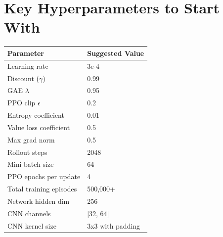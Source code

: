 \documentclass[11pt,a4paper]{article}
\begin{document}
\section{Key Hyperparameters to Start With}
\begin{tabular}{|l|l|}
\hline
\textbf{Parameter} & \textbf{Suggested Value} \\
\hline
Learning rate & 3e-4 \\
Discount ($\gamma$) & 0.99 \\
GAE $\lambda$ & 0.95 \\
PPO clip $\epsilon$ & 0.2 \\
Entropy coefficient & 0.01 \\
Value loss coefficient & 0.5 \\
Max grad norm & 0.5 \\
Rollout steps & 2048 \\
Mini-batch size & 64 \\
PPO epochs per update & 4 \\
Total training episodes & 500,000+ \\
Network hidden dim & 256 \\
CNN channels & [32, 64] \\
CNN kernel size & 3x3 with padding \\
\hline
\end{tabular}
\end{document}
